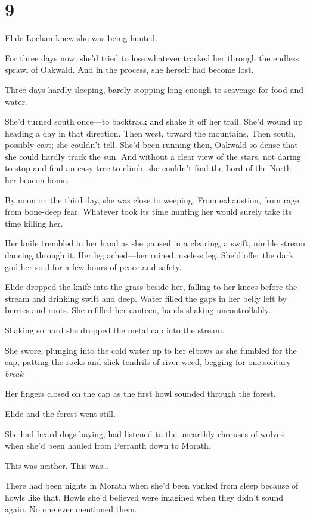 
\chapter{9}

Elide Lochan knew she was being hunted.

For three days now, she'd tried to lose whatever tracked her through the endless sprawl of Oakwald.
And in the process, she herself had become lost.

Three days hardly sleeping, barely stopping long enough to scavenge for food and water.

She'd turned south once---to backtrack and shake it off her trail.
She'd wound up heading a day in that direction.
Then west, toward the mountains.
Then south, possibly east; she couldn't tell.
She'd been running then, Oakwald so dense that she could hardly track the sun.
And without a clear view of the stars, not daring to stop and find an easy tree to climb, she couldn't find the Lord of the North---her beacon home.

By noon on the third day, she was close to weeping.
From exhaustion, from rage, from bone-deep fear.
Whatever took its time hunting her would surely take its time killing her.

Her knife trembled in her hand as she paused in a clearing, a swift, nimble stream dancing through it.
Her leg ached---her ruined, useless leg.
She'd offer the dark god her soul for a few hours of peace and safety.

Elide dropped the knife into the grass beside her, falling to her knees before the stream and drinking swift and deep.
Water filled the gaps in her belly left by berries and roots.
She refilled her canteen, hands shaking uncontrollably.

Shaking so hard she dropped the metal cap into the stream.

She swore, plunging into the cold water up to her elbows as she fumbled for the cap, patting the rocks and slick tendrils of river weed, begging for one solitary \emph{break}---

Her fingers closed on the cap as the first howl sounded through the forest.

Elide and the forest went still.

She had heard dogs baying, had listened to the unearthly choruses of wolves when she'd been hauled from Perranth down to Morath.

This was neither.
This was\ldots{}

There had been nights in Morath when she'd been yanked from sleep because of howls like that.
Howls she'd believed were imagined when they didn't sound again.
No one ever mentioned them.

